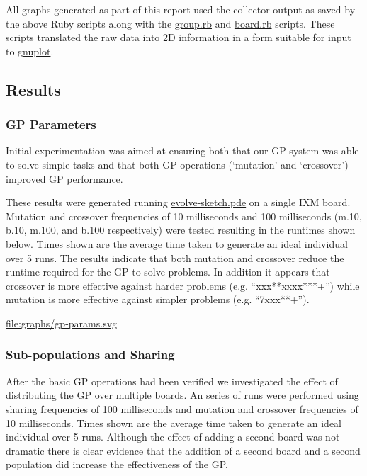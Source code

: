 \documentclass[11pt]{article}
\begin{document}
All graphs generated as part of this report used the collector output
as saved by the above Ruby scripts along with the \href{file:///nfs/adaptive/eschulte/src/gp4ixm-report/src/group.rb}{group.rb} and
\href{file:///nfs/adaptive/eschulte/src/gp4ixm-report/src/board.rb}{board.rb} scripts.  These scripts translated the raw data into 2D
information in a form suitable for input to \href{http://www.gnuplot.info/}{gnuplot}.

\subsection*{Results}
\label{sec-1.5}

\subsubsection*{GP Parameters}
\label{sec-1.5.1}

Initial experimentation was aimed at ensuring both that our GP system
was able to solve simple tasks and that both GP operations (`mutation'
and `crossover') improved GP performance.

These results were generated running \href{file:///nfs/adaptive/eschulte/src/gp4ixm-report/src/evolve-sketch.pde}{evolve-sketch.pde} on a single IXM
board.  Mutation and crossover frequencies of 10 milliseconds and 100
milliseconds (m.10, b.10, m.100, and b.100 respectively) were tested
resulting in the runtimes shown below.  Times shown are the average
time taken to generate an ideal individual over 5 runs.  The results
indicate that both mutation and crossover reduce the runtime required
for the GP to solve problems.  In addition it appears that crossover
is more effective against harder problems (e.g. ``xxx**xxxx***+'') while
mutation is more effective against simpler problems (e.g. ``7xxx**+'').



\href{file:///nfs/adaptive/eschulte/src/gp4ixm-report/graphs/gp-params.svg}{file:graphs/gp-params.svg}

\subsubsection*{Sub-populations and Sharing}
\label{sec-1.5.2}

After the basic GP operations had been verified we investigated the
effect of distributing the GP over multiple boards.  An series of runs
were performed using sharing frequencies of 100 milliseconds and
mutation and crossover frequencies of 10 milliseconds.  Times shown
are the average time taken to generate an ideal individual over 5
runs.  Although the effect of adding a second board was not dramatic
there is clear evidence that the addition of a second board and a
second population did increase the effectiveness of the GP.
\end{document}
